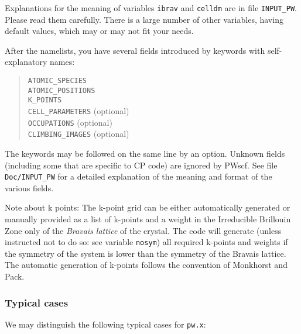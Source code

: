 \documentclass[12pt,a4paper]{article}
\begin{document}
Explanations for the meaning of variables \texttt{ibrav} and
\texttt{celldm} are in file \texttt{INPUT\_PW}.
Please read them carefully.
There is a large number of other variables, having default values,
which may or may not fit your needs.

After the namelists, you have several fields introduced by keywords
with self-explanatory names:

\begin{quote}
  \texttt{ATOMIC\_SPECIES}\\
  \texttt{ATOMIC\_POSITIONS}\\
  \texttt{K\_POINTS}\\
  \texttt{CELL\_PARAMETERS} (optional)\\
  \texttt{OCCUPATIONS} (optional) \\
  \texttt{CLIMBING\_IMAGES} (optional)
\end{quote}

The keywords may be followed on the same line by an option.
Unknown fields (including some that are specific to CP code)
are ignored by PWscf.
See file \texttt{Doc/INPUT\_PW} for a detailed explanation of the
meaning and format of the various fields.

Note about k points:
The k-point grid can be either automatically generated or manually
provided as a list of k-points and a weight in the Irreducible
Brillouin Zone only of the \emph{Bravais lattice} of the crystal.
The code will generate (unless instructed not to do so: see variable
\texttt{nosym}) all required k-points and weights if the symmetry of
the system is lower than the symmetry of the Bravais lattice.
The automatic generation of k-points follows the convention of
Monkhorst and Pack.

\subsubsection{Typical cases}

We may distinguish the following typical cases for \texttt{pw.x}:
\end{document}

